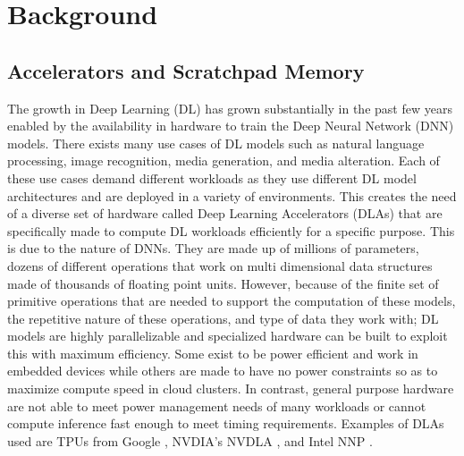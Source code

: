 
\chapter{Background} %

\label{Chapter1} %


\section{Accelerators and Scratchpad Memory}
The growth in Deep Learning (DL) has grown substantially in the past few years
enabled by the availability in hardware to train the Deep Neural Network (DNN)
models. There exists many use cases of DL models such as natural language
processing, image recognition, media generation, and media alteration. Each of
these use cases demand different workloads as they use different DL model
architectures and are deployed in a variety of environments. This creates the
need of a diverse set of hardware called Deep Learning Accelerators (DLAs) that
are specifically made to compute DL workloads efficiently for a specific
purpose. This is due to the nature of DNNs. They are made up of millions of
parameters, dozens of different operations that work on multi dimensional data
structures made of thousands of floating point units. However, because of the
finite set of primitive operations that are needed to support the computation
of these models, the repetitive nature of these operations, and type of data
they work with; DL models are highly parallelizable and specialized hardware
can be built to exploit this with maximum efficiency. Some exist to be power
efficient and work in embedded devices while others are made to have no power
constraints so as to maximize compute speed in cloud clusters. In contrast, general
purpose hardware are not able to meet power management needs of many workloads
or cannot compute inference fast enough to meet timing requirements. Examples
of DLAs used are TPUs from Google \cite{tensorflow}, NVDIA's NVDLA \cite{nvdla}, and Intel NNP \cite{nnp}.

